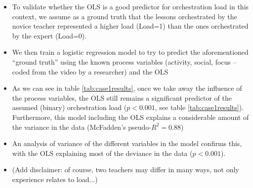 \documentclass[10pt,journal,compsoc]{IEEEtran}
\begin{document}
\begin{itemize}
\item To validate whether the OLS is a good predictor for orchestration load in this context, we assume as a ground truth that the lessons orchestrated by the novice teacher represented a higher load (Load=1) than the ones orchestrated by the expert (Load=0). 
\item We then train a logistic regression model to try to predict the aforementioned ``ground truth'' using the known process variables (activity, social, focus -- coded from the video by a researcher) and the OLS
\item As we can see in table \ref{tab:case1results}, once we take away the influence of the process variables, the OLS still remains a significant predictor of the assumed (binary) orchestration load ($p<0.001$, see table \ref{tab:case1results}). Furthermore, this model including the OLS explains a considerable amount of the variance in the data (McFadden's pseudo-$R^2=0.88$) 
\item An analysis of variance of the different variables in the model confirms this, with the OLS explaining most of the deviance in the data ($p<0.001$). 
\item (Add disclaimer: of course, two teachers may differ in many ways, not only experience relates to load...)
\end{itemize}
\end{document}

